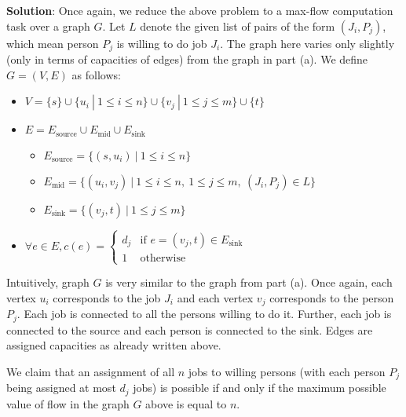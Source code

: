 \documentclass[11pt, fleqn]{article}
\begin{document}
\bigskip

\textbf{Solution}: Once again, we reduce the above problem to a max-flow computation task over a graph $G$. Let $L$ denote the given list of pairs of the form $(J_i, P_j)$, which mean person $P_j$ is willing to do job $J_i$. The graph here varies only slightly (only in terms of capacities of edges) from the graph in part (a). We define $G=(V,E)$ as follows:
\begin{itemize}
    \item $V = \{s\}\cup\{u_i\ |\ 1\leq i\leq n\}\cup\{v_j\ |\ 1\leq j\leq m\}\cup\{t\}$
    \item $E = E_{\text{source}}\cup E_{\text{mid}}\cup E_{\text{sink}}$
    \begin{itemize}
        \item $E_{\text{source}} = \{(s,u_i)\ |\ 1\leq i\leq n\}$
        \item $E_{\text{mid}} = \{(u_i,v_j)\ |\ 1\leq i\leq n,\ 1\leq j\leq m,\ (J_i,P_j)\in L\}$
        \item $E_{\text{sink}} = \{(v_j,t)\ |\ 1\leq j\leq m\}$
    \end{itemize}
    \item $\forall e\in E, c(e)=\begin{cases}
    d_j & \text{if } e = (v_j,t) \in E_{\text{sink}}\\
    1 & \text{otherwise}
    \end{cases}$
\end{itemize}
Intuitively, graph $G$ is very similar to the graph from part (a). Once again, each vertex $u_i$ corresponds to the job $J_i$ and each vertex $v_j$ corresponds to the person $P_j$. Each job is connected to all the persons willing to do it. Further, each job is connected to the source and each person is connected to the sink. Edges are assigned capacities as already written above.

\bigskip

We claim that an assignment of all $n$ jobs to willing persons (with each person $P_j$ being assigned at most $d_j$ jobs) is possible if and only if the maximum possible value of flow in the graph $G$ above is equal to $n$.
\end{document}
